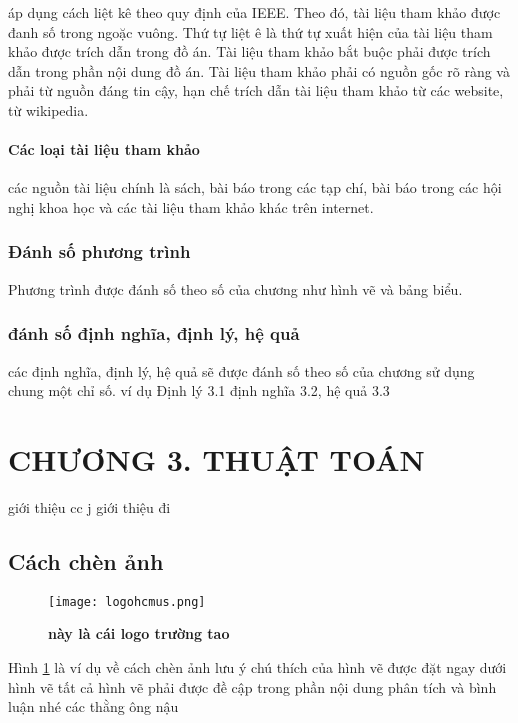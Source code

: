 \documentclass{article}
\begin{document}
áp dụng cách liệt kê theo quy định của IEEE. Theo đó, tài liệu tham khảo được đanh số trong ngoặc vuông. Thứ tự liệt ê là thứ tự xuất hiện của tài liệu tham khảo được trích dẫn trong đồ án. Tài liệu tham khảo bắt buộc phải được trích dẫn trong phần nội dung đồ án. Tài liệu tham khảo phải có nguồn gốc rõ ràng và phải từ nguồn đáng tin cậy, hạn chế trích dẫn tài liệu tham khảo từ các website, từ wikipedia.
\paragraph{Các loại tài liệu tham khảo}\mbox{}
các nguồn tài liệu chính là sách, bài báo trong các tạp chí, bài báo trong các hội nghị khoa học và các tài liệu tham khảo khác trên internet.
\subsubsection{Đánh số phương trình}
Phương trình được đánh số theo số của chương như hình vẽ và bảng biểu.
\subsubsection{đánh số định nghĩa, định lý, hệ quả}
các định nghĩa, định lý, hệ quả sẽ được đánh số theo số của chương sử dụng chung một chỉ số. ví dụ Định lý 3.1 định nghĩa 3.2, hệ quả 3.3


\newpage
\section*{CHƯƠNG 3. THUẬT TOÁN}
\setcounter{section}{3}
giới thiệu cc j giới thiệu đi
\subsection{Cách chèn ảnh }
\setcounter{figure}{0}%
\begin{figure}[H]
    \centering
    \texttt{[image: logohcmus.png]}
    \caption{\bfseries\fontsize{12pt}{0pt} này là cái logo trường tao}
    \label{hinh3.1}
\end{figure}
Hình \ref{hinh3.1} là ví dụ về cách chèn ảnh lưu ý chú thích của hình vẽ được đặt ngay dưới hình vẽ tất cả hình vẽ phải được đề cập trong phần nội dung phân tích và bình luận nhé các thằng ông nậu
\end{document}
